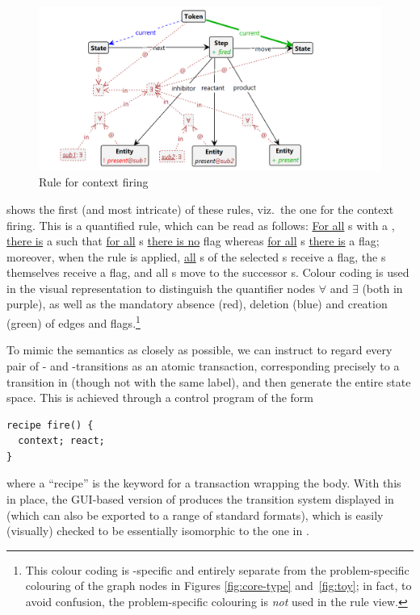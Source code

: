 \begin{figure}
\centering
\includegraphics[scale=.2]{figs/context}
\caption{Rule for context firing}
\label{fig:context}
\end{figure}
%
 shows the first (and most intricate) of these rules, viz.\ the one for the context firing. This is a quantified rule, which can be read as follows: \uline{For all} \State{}s with a \Token, \uline{there is} a \nextt{} \Step such that \uline{for all} \inhibitor{}s \uline{there is no} \present flag whereas \uline{for all} \reactant{}s \uline{there is} a \present flag; moreover, when the rule is applied, \uline{all} \product{}s of the selected \Step{}s receive a \present flag, the \Step{}s themselves receive a \fired flag, and all \Token{}s move to the successor \State{}s. Colour coding is used in the visual representation to distinguish the quantifier nodes $\forall$ and $\exists$ (both in purple), as well as the mandatory absence (red), deletion (blue) and creation (green) of edges and flags.\footnote{This colour coding is \GROOVE-specific and entirely separate from the problem-specific colouring of the graph nodes in Figures \ref{fig:core-type} and~\ref{fig:toy}; in fact, to avoid confusion, the problem-specific colouring is \emph{not} used in the rule view.}

To mimic the \BioResolve semantics as closely as possible, we can instruct \GROOVE to regard every pair of \contextR- and \reactR-transitions as an atomic transaction, corresponding precisely to a transition in \BioResolve (though not with the same label), and then generate the entire state space. This is achieved through a control program of the form
%
\begin{lstlisting}[keywordstyle=\bfseries,morekeywords={recipe}]
recipe fire() {
  context; react;
}
\end{lstlisting}
%
where a ``recipe'' is the keyword for a transaction wrapping the body. With this in place, the GUI-based version of \GROOVE produces the transition system displayed in  (which can also be exported to a range of standard formats), which is easily (visually) checked to be essentially isomorphic to the one in .

